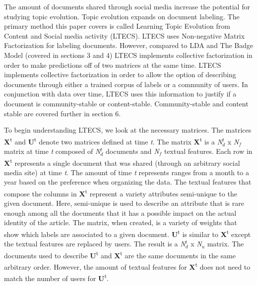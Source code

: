 \documentclass{sig-alternate}
\begin{document}
The amount of documents shared through social media increase the 
potential for studying topic evolution. 
Topic evolution expands on document labeling. 
The primary method this paper covers is called Learning Topic Evolution from Content and Social media activity (LTECS). 
LTECS uses Non-negative Matrix Factorization for labeling documents. 
However, compared to LDA and The Badge Model (covered in sections 3 and 4) LTECS implements collective factorization in order to make predictions off of two matrices at the same time. 
LTECS implements collective factorization in order to allow the option of describing documents through either a trained corpus of labels or a community of users. 
In conjunction with data over time, LTECS uses this information to justify if a document is community-stable or content-stable. 
Community-stable and content stable are covered further in section 6.

To begin understanding LTECS, we look at the necessary matrices. 
The matrices \textbf{X}\textsuperscript{t} and \textbf{U}\textsuperscript{t} denote two matrices defined at time \textit{t}.
The matrix \textbf{X}\textsuperscript{t} is a \textit{N}$_d^t$ x \textit{N}$_f$ matrix at time \textit{t} composed of \textit{N}$_d^t$ documents and \textit{N}$_f$ textual features.
Each row in \textbf{X}\textsuperscript{t} represents a single document that was shared (through an arbitrary social media site) at time \textit{t}. 
The amount of time \textit{t} represents ranges from a month to a year based on the preference when organizing the data.
The textual features that compose the columns in \textbf{X}\textsuperscript{t} represent a variety attributes semi-unique to the given document. 
Here, semi-unique is used to describe an attribute that is rare enough among all the documents that it has a possible impact on the actual identity of the article.
The matrix, when created, is a variety of weights that show which labels are associated to a given document. 
\textbf{U}\textsuperscript{t} is similar to \textbf{X}\textsuperscript{t} except the textual features are replaced by users. 
The result is a \textit{N}$_d^t$ x \textit{N}$_u$ matrix. 
The documents used to describe \textbf{U}\textsuperscript{t} and \textbf{X}\textsuperscript{t} are the same documents in the same arbitrary order. 
However, the amount of textual features for \textbf{X}\textsuperscript{t} does not need to match the number of users for  \textbf{U}\textsuperscript{t}.
\end{document}
